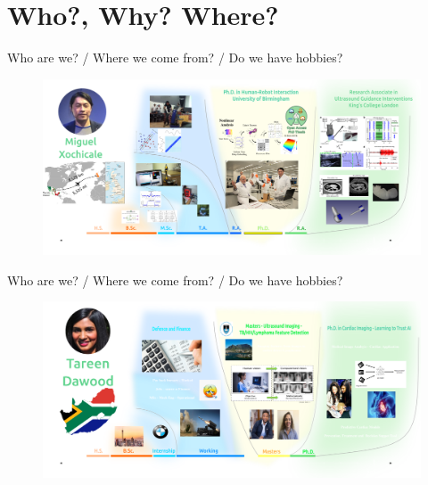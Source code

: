 \section{Who?, Why? Where?}



{
\begin{frame}{Who are we? / Where we come from? / Do we have hobbies?}

  \begin{figure}
  \centering
  \includegraphics[width=1.0\textwidth]{./../figures/team/miguel-xochicale/versions/drawing-v04.png}
  \end{figure}

\end{frame}
}

{
\begin{frame}{Who are we? / Where we come from? / Do we have hobbies?}

  \begin{figure}
  \centering
  \includegraphics[width=1.0\textwidth]{./../figures/team/tareen-dawood/versions/drawing-v00.png}
  \end{figure}

\end{frame}
}



